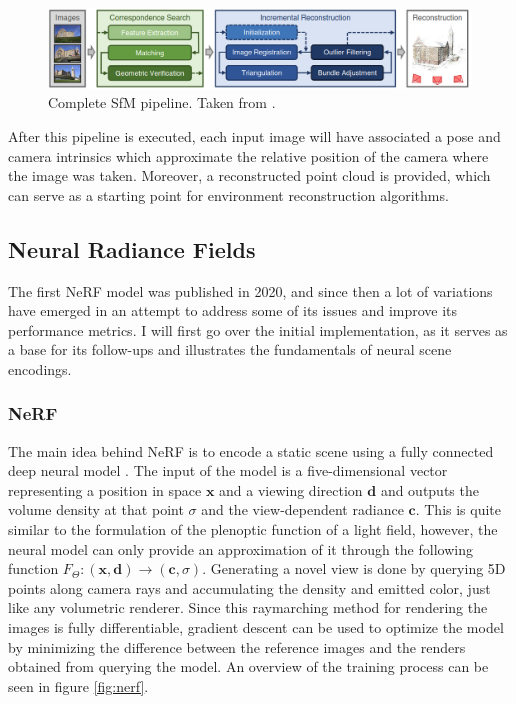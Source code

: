 \begin{figure}[H]
    \centering
    \includegraphics[width=0.7\linewidth]{figures/sfm.png}
    \caption{Complete SfM pipeline. Taken from \cite{schoenberger2016sfm}.}
    \label{fig:sfmpipeline}
\end{figure}

After this pipeline is executed, each input image will have associated a pose and camera intrinsics which approximate the relative position of the camera where the image was taken. Moreover, a reconstructed point cloud is provided, which can serve as a starting point for environment reconstruction algorithms. 

\subsection{Neural Radiance Fields}

The first NeRF model was published in 2020, and since then a lot of variations have emerged in an attempt to address some of its issues and improve its performance metrics. I will first go over the initial implementation, as it serves as a base for its follow-ups and illustrates the fundamentals of neural scene encodings.
\subsubsection{NeRF}

The main idea behind NeRF is to encode a static scene using a fully connected deep neural model \cite{mildenhall2020nerf}. The input of the model is a five-dimensional vector representing a position in space $\textbf{x}$ and a viewing direction $\textbf{d}$ and outputs the volume density at that point $\sigma$ and the view-dependent radiance $\textbf{c}$. This is quite similar to the formulation of the plenoptic function of a light field, however, the neural model can only provide an approximation of it through the following function $F_\Theta : (\textbf{x}, \textbf{d}) \rightarrow (\textbf{c}, \sigma) $. Generating a novel view is done by querying 5D points along camera rays and accumulating the density and emitted color, just like any volumetric renderer. Since this raymarching method for rendering the images is fully differentiable, gradient descent can be used to optimize the model by minimizing the difference between the reference images and the renders obtained from querying the model. An overview of the training process can be seen in figure \ref{fig:nerf}.

